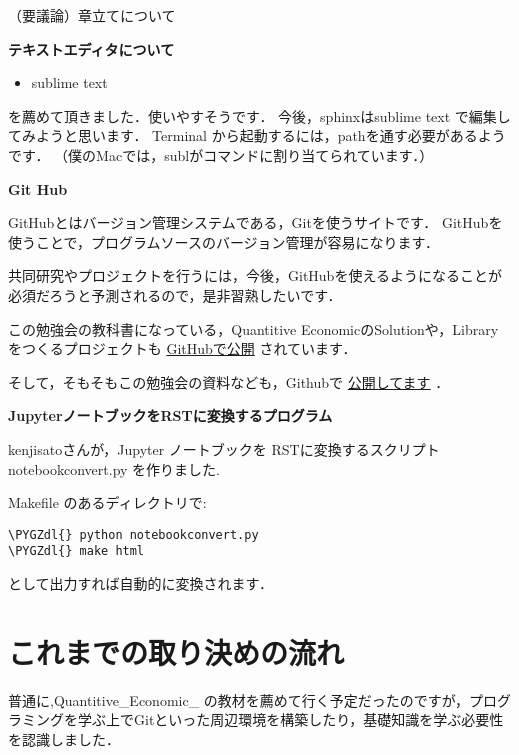 \documentclass[letterpaper,10pt,english]{sphinxmanual}
\def\PYGZdl{\char`\$}
\begin{document}
（要議論）章立てについて

\textbf{テキストエディタについて}
\begin{itemize}
\item {} 
sublime text

\end{itemize}

を薦めて頂きました．使いやすそうです．
今後，sphinxはsublime text で編集してみようと思います．
Terminal から起動するには，pathを通す必要があるようです．
（僕のMacでは，sublがコマンドに割り当てられています．）

\textbf{Git Hub}

GitHubとはバージョン管理システムである，Gitを使うサイトです．
GitHubを使うことで，プログラムソースのバージョン管理が容易になります．

共同研究やプロジェクトを行うには，今後，GitHubを使えるようになることが必須だろうと予測されるので，是非習熟したいです．

この勉強会の教科書になっている，Quantitive EconomicのSolutionや，Libraryをつくるプロジェクトも \href{https://github.com/QuantEcon/QuantEcon.py}{GitHubで公開} されています．

そして，そもそもこの勉強会の資料なども，Githubで \href{https://github.com/Akira55/sphinx}{公開してます} ．
\begin{quote}
\end{quote}

\textbf{JupyterノートブックをRSTに変換するプログラム}

kenjisatoさんが，Jupyter ノートブックを RSTに変換するスクリプト notebookconvert.py を作りました.

Makefile のあるディレクトリで:

\begin{Verbatim}[commandchars=\\\{\}]
\PYGZdl{} python notebookconvert.py
\PYGZdl{} make html
\end{Verbatim}

として出力すれば自動的に変換されます．


\chapter{これまでの取り決めの流れ}
\label{chap1/sec3::doc}\label{chap1/sec3:id1}
普通に,Quantitive\_Economic\_ の教材を薦めて行く予定だったのですが，プログラミングを学ぶ上でGitといった周辺環境を構築したり，基礎知識を学ぶ必要性を認識しました．
\end{document}
